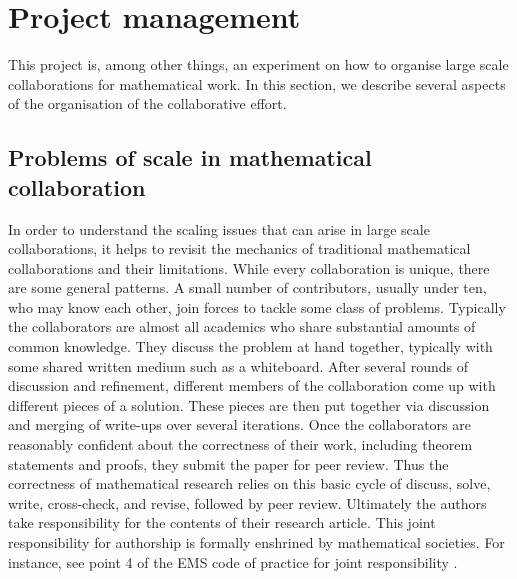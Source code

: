 \section{Project management}\label{project-sec}

This project is, among other things, an experiment on how to organise large scale collaborations for mathematical work. In this section, we describe several aspects of the organisation of the collaborative effort.

\subsection{Problems of scale in mathematical collaboration}
In order to understand the scaling issues that can arise in large scale collaborations, it helps to revisit the mechanics of traditional mathematical collaborations and their limitations. While every collaboration is unique, there are some general patterns. A small number of contributors, usually under ten, who may know each other, join forces to tackle some class of problems. Typically the collaborators are almost all academics who share substantial amounts of common knowledge. They discuss the problem at hand together, typically with some shared written medium such as a whiteboard. After several rounds of discussion and refinement, different members of the collaboration come up with different pieces of a solution. These pieces are then put together via discussion and merging of write-ups over several iterations. Once the collaborators are reasonably confident about the correctness of their work, including theorem statements and proofs, they submit the paper for peer review. Thus the correctness of mathematical research relies on this basic cycle of discuss, solve, write, cross-check, and revise, followed by peer review. Ultimately the authors take responsibility for the contents of their research article. This joint responsibility for authorship is formally enshrined by mathematical societies. For instance, see point 4 of the EMS code of practice for joint responsibility \cite{EMS_code_of_practice}.

